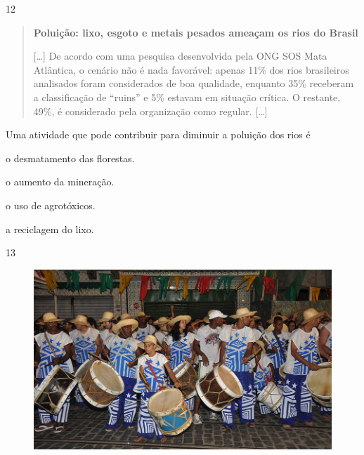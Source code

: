 
\num{12}

\begin{quote}
\textbf{Poluição: lixo, esgoto e metais pesados ameaçam os rios do
Brasil}

{[}\ldots{}{]}
De acordo com uma pesquisa desenvolvida pela ONG SOS Mata Atlântica, o
cenário não é nada favorável: apenas 11\% dos rios brasileiros
analisados foram considerados de boa qualidade, enquanto 35\% receberam
a classificação de “ruins” e 5\% estavam em situação crítica. O
restante, 49\%, é considerado pela organização como regular. {[}\ldots{}{]}

\end{quote}

Uma atividade que pode contribuir para diminuir a poluição dos rios é

\begin{minipage}{0.5\textwidth}
\begin{escolha}
\item o desmatamento das florestas.

\item o aumento da mineração.

\item o uso de agrotóxicos.

\item a reciclagem do lixo.
\end{escolha}
\end{minipage}

\pagebreak
\num{13}

\begin{figure}[htpb!]
\includegraphics[width=\textwidth]{./imgs/img66.png}
\end{figure}

